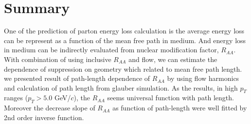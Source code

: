 \section{Summary}

One of the prediction of parton energy loss calculation is the average energy loss can be represent as a function of the mean free path in medium. And energy loss in medium can be indirectly evaluated from nuclear modification factor, $R_{AA}$. With combination of using inclusive $R_{AA}$ and flow, we can estimate the dependence of suppression on geometry which related to mean free path length. we presented result of path-length dependence of $R_{AA}$ by using flow harmonics and calculation of path length from glauber simulation. As the results, in high $p_T$ ranges ($p_T > 5.0$ GeV/$c$), the $R_{AA}$ seems universal function with path length. Moreover the decrease slope of $R_{AA}$ as function of path-length were well fitted by 2nd order inverse function.